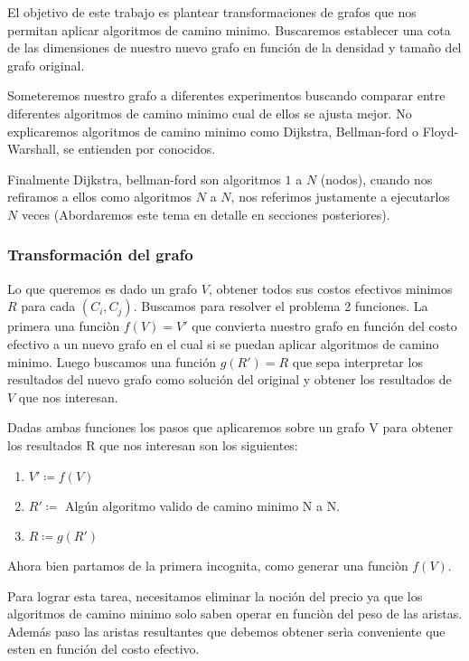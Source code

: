 \documentclass[12pt]{article}
\def\is{\coloneqq}
\begin{document}
El objetivo de este trabajo es plantear transformaciones de grafos que nos permitan aplicar algoritmos de camino minimo. Buscaremos establecer una cota de las dimensiones de nuestro nuevo grafo en función de la densidad y tamaño del grafo original.

Someteremos nuestro grafo a diferentes experimentos buscando comparar entre diferentes algoritmos de camino minimo cual de ellos se ajusta mejor. No explicaremos algoritmos de camino minimo como Dijkstra, Bellman-ford o Floyd-Warshall, se entienden por conocidos.

Finalmente Dijkstra, bellman-ford son algoritmos $1$ a $N$ (nodos), cuando nos refiramos a ellos como algoritmos $N$ a $N$, nos referimos justamente a ejecutarlos $N$ veces (Abordaremos este tema en detalle en secciones posteriores).

\subsubsection{Transformación del grafo}

Lo que queremos es dado un grafo $V$, obtener todos sus costos efectivos minimos $R$ para cada $(C_i, C_j)$. Buscamos para resolver el problema 2 funciones. La primera una funciòn $f(V) = V'$ que convierta nuestro grafo en función del costo efectivo a un nuevo grafo en el cual si se puedan aplicar algoritmos de camino minimo. Luego buscamos una función $g(R') = R$ que sepa interpretar los resultados del nuevo grafo como solución del original y obtener los resultados de $V$ que nos interesan.

Dadas ambas funciones los pasos que aplicaremos sobre un grafo V para obtener los resultados R que nos interesan son los siguientes:

\begin{enumerate}
	\item $V' \is f(V)$
	\item $R' \is$ Algún algoritmo valido de camino minimo N a N.
	\item $R \is g(R')$
\end{enumerate}

Ahora bien partamos de la primera incognita, como generar una funciòn $f(V)$.

Para lograr esta tarea, necesitamos eliminar la noción del precio ya que los algoritmos de camino minimo solo saben operar en funciòn del peso de las aristas. Además paso las aristas resultantes que debemos obtener serìa conveniente que esten en función del costo efectivo.
\end{document}

